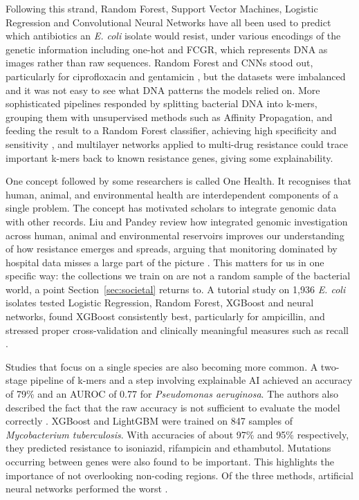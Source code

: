 \vspace{1em}

Following this strand, Random Forest, Support Vector Machines, Logistic Regression and Convolutional Neural Networks have all been used to predict which antibiotics an \textit{E. coli} isolate would resist, under various encodings of the genetic information including one-hot and FCGR, which represents DNA as images rather than raw sequences. Random Forest and CNNs stood out, particularly for ciprofloxacin and gentamicin \cite{Ren2022}, but the datasets were imbalanced and it was not easy to see what DNA patterns the models relied on. More sophisticated pipelines responded by splitting bacterial DNA into k-mers, grouping them with unsupervised methods such as Affinity Propagation, and feeding the result to a Random Forest classifier, achieving high specificity and sensitivity \cite{Parthasarathi2024}, and multilayer networks applied to multi-drug resistance could trace important k-mers back to known resistance genes, giving some explainability.

\vspace{1em}

One concept followed by some researchers is called One Health. It recognises that human, animal, and environmental health are interdependent components of a single problem. The concept has motivated scholars to integrate genomic data with other records. Liu and Pandey review how integrated genomic investigation across human, animal and environmental reservoirs improves our understanding of how resistance emerges and spreads, arguing that monitoring dominated by hospital data misses a large part of the picture \cite{Liu2024}. This matters for us in one specific way: the collections we train on are not a random sample of the bacterial world, a point Section~\ref{sec:societal} returns to. A tutorial study on 1,936 \textit{E. coli} isolates tested Logistic Regression, Random Forest, XGBoost and neural networks, found XGBoost consistently best, particularly for ampicillin, and stressed proper cross-validation and clinically meaningful measures such as recall \cite{Orcales2024}.

\vspace{1em}

Studies that focus on a single species are also becoming more common. A two-stage pipeline of k-mers and a step involving explainable AI achieved an accuracy of 79\% and an AUROC of 0.77 for \textit{Pseudomonas aeruginosa}. The authors also described the fact that the raw accuracy is not sufficient to evaluate the model correctly \cite{jain2025paeruginosa}. XGBoost and LightGBM were trained on 847 samples of \textit{Mycobacterium tuberculosis}. With accuracies of about 97\% and 95\% respectively, they predicted resistance to isoniazid, rifampicin and ethambutol. Mutations occurring between genes were also found to be important. This highlights the importance of not overlooking non-coding regions. Of the three methods, artificial neural networks performed the worst \cite{ParedesGutierrez2025}.

